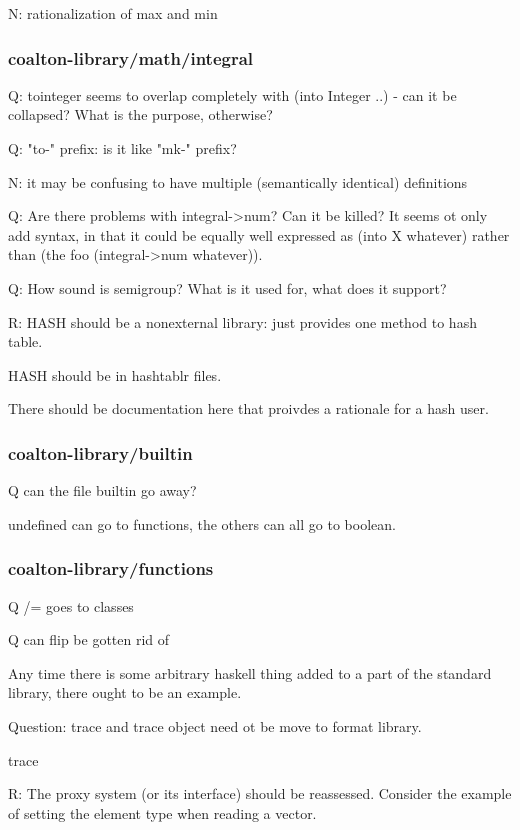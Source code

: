 \documentclass[12pt]{article}
\begin{document}
N: rationalization of max and min

\subsubsection{coalton-library/math/integral}

Q: tointeger seems to overlap completely with (into Integer ..)
- can it be collapsed? What is the purpose, otherwise?

Q: "to-" prefix: is it like "mk-" prefix?

N: it may be confusing to have multiple (semantically identical)
definitions

Q: Are there problems with integral->num? Can it be killed? It seems
ot only add syntax, in that it could be equally well expressed as
(into X whatever) rather than (the foo (integral->num whatever)).

Q: How sound is semigroup? What is it used for, what does it support?

R: HASH should be a nonexternal library: just provides one method to hash table.

HASH should be in hashtablr files.

There should be documentation here that proivdes a rationale for a hash user.

\subsubsection{coalton-library/builtin}

Q can the file builtin go away?

undefined can go to functions, the others can all go to boolean.

\subsubsection{coalton-library/functions}

Q /= goes to classes

Q can flip be gotten rid of

Any time there is some arbitrary haskell thing added to a part of the
standard library, there ought to be an example.

Question: trace and trace object need ot be move to format library.

trace

R: The proxy system (or its interface) should be reassessed. Consider
the example of setting the element type when reading a vector.
\end{document}

